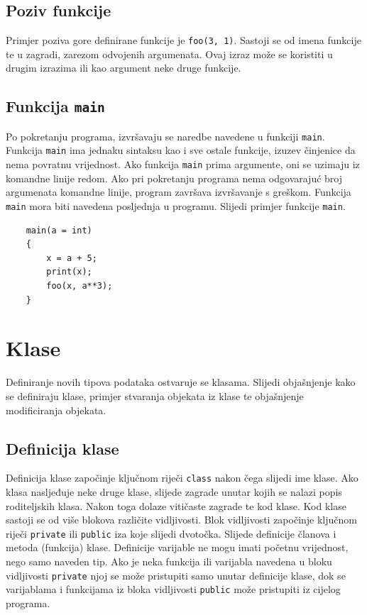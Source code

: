 \documentclass[times, utf8, zavrsni]{fer}
\begin{document}
\subsection{Poziv funkcije}
Primjer poziva gore definirane funkcije je \verb|foo(3, 1)|. Sastoji se od imena funkcije te u zagradi, zarezom odvojenih argumenata. Ovaj izraz može se koristiti u 
drugim izrazima ili kao argument neke druge funkcije.

\subsection{Funkcija \texttt{main}}
Po pokretanju programa, izvršavaju se naredbe navedene u funkciji \verb|main|. Funkcija \verb|main| ima jednaku sintaksu kao i sve ostale funkcije, 
izuzev činjenice da nema povratnu vrijednost.
Ako funkcija \verb|main| prima argumente, oni se uzimaju iz komandne linije redom. Ako pri pokretanju programa nema
odgovarajuć broj argumenata komandne linije, program završava izvršavanje s greškom. Funkcija \verb|main| mora biti navedena posljednja u programu. 
Slijedi primjer funkcije \verb|main|.
\begin{verbatim}
    main(a = int)
    {
        x = a + 5;
        print(x);
        foo(x, a**3);
    }
\end{verbatim}

\section{Klase}
Definiranje novih tipova podataka ostvaruje se klasama. Slijedi objašnjenje kako se definiraju klase, primjer stvaranja objekata iz klase 
te objašnjenje modificiranja objekata.

\subsection{Definicija klase}
Definicija klase započinje ključnom riječi \verb|class| nakon čega slijedi ime klase. Ako klasa nasljeđuje neke druge klase, slijede zagrade unutar kojih se nalazi 
popis roditeljskih klasa. Nakon toga dolaze vitičaste zagrade te kod klase. Kod klase sastoji se od više blokova različite vidljivosti. Blok vidljivosti
započinje ključnom riječi \verb|private| ili \verb|public| iza koje slijedi dvotočka. Slijede definicije članova i metoda (funkcija) klase.
Definicije varijable ne mogu imati početnu vrijednost, nego samo naveden tip. Ako je neka funkcija ili varijabla navedena u bloku vidljivosti \verb|private|
njoj se može pristupiti samo unutar definicije klase, dok se varijablama i funkcijama iz bloka vidljivosti \verb|public| može pristupiti iz cijelog programa.
\end{document}
